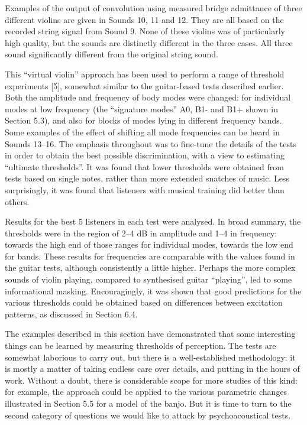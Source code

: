   Examples of the output of convolution using measured bridge admittance of 
  three different violins are given in Sounds 10, 11 and 12. They are all based 
  on the recorded string signal from Sound 9. None of these violins was of 
  particularly high quality, but the sounds are distinctly different in the 
  three cases. All three sound significantly different from the original string 
  sound. 

  This “virtual violin” approach has been used to perform a range of threshold 
  experiments [5], somewhat similar to the guitar-based tests described 
  earlier. Both the amplitude and frequency of body modes were changed: for 
  individual modes at low frequency (the “signature modes” A0, B1- and B1+ 
  shown in Section 5.3), and also for blocks of modes lying in different 
  frequency bands. Some examples of the effect of shifting all mode frequencies 
  can be heard in Sounds 13--16. The emphasis throughout was to fine-tune the 
  details of the tests in order to obtain the best possible discrimination, 
  with a view to estimating “ultimate thresholds”. It was found that lower 
  thresholds were obtained from tests based on single notes, rather than more 
  extended snatches of music. Less surprisingly, it was found that listeners 
  with musical training did better than others. 

  Results for the best 5 listeners in each test were analysed. In broad 
  summary, the thresholds were in the region of 2--4 dB in amplitude and 1--4%
  in frequency: towards the high end of those ranges for individual modes, 
  towards the low end for bands. These results for frequencies are comparable 
  with the values found in the guitar tests, although consistently a little 
  higher. Perhaps the more complex sounds of violin playing, compared to 
  synthesised guitar ``playing'', led to some informational masking. 
  Encouragingly, it was shown that good predictions for the various thresholds 
  could be obtained based on differences between excitation patterns, as 
  discussed in Section 6.4. 

  The examples described in this section have demonstrated that some 
  interesting things can be learned by measuring thresholds of perception. The 
  tests are somewhat laborious to carry out, but there is a well-established 
  methodology: it is mostly a matter of taking endless care over details, and 
  putting in the hours of work. Without a doubt, there is considerable scope 
  for more studies of this kind: for example, the approach could be applied to 
  the various parametric changes illustrated in Section 5.5 for a model of the 
  banjo. But it is time to turn to the second category of questions we would 
  like to attack by psychoacoustical tests. 



